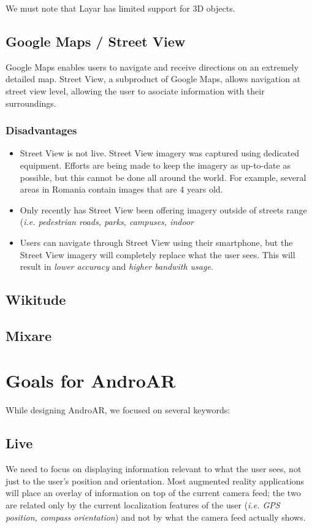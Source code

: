 \documentclass[a4paper,onecolumn,oneside,titlepage,11pt]{article}
\begin{document}
We must note that Layar has limited support for 3D objects.
\subsection{Google Maps / Street View}
Google Maps enables users to navigate and receive directions on an extremely detailed map. Street View, a subproduct of Google Maps, allows navigation at street view level, allowing the user to asociate information with their surroundings.
\subsubsection*{Disadvantages}
\begin{itemize}
	\item Street View is not live. Street View imagery was captured using dedicated equipment. Efforts are being made to keep the imagery as up-to-date as possible, but this cannot be done all around the world. For example, several areas in Romania contain images that are 4 years old.
	\item Only recently has Street View been offering imagery outside of streets range (\emph{i.e. pedestrian roads, parks, campuses, indoor}
	\item Users can navigate through Street View using their smartphone, but the Street View imagery will completely replace what the user sees. This will result in \emph{lower accuracy} and \emph{higher bandwith usage}.
\end{itemize}
\subsection{Wikitude}
\subsection{Mixare}

\clearpage
\section{Goals for AndroAR}
While designing AndroAR, we focused on several keywords:
\subsection*{Live}
We need to focus on displaying information relevant to what the user sees, not just to the user's position and orientation. Most augmented reality applications will place an overlay of information on top of the current camera feed; the two are related only by the current localization features of the user (\emph{i.e. GPS position, compass orientation}) and not by what the camera feed actually shows.
\end{document}
